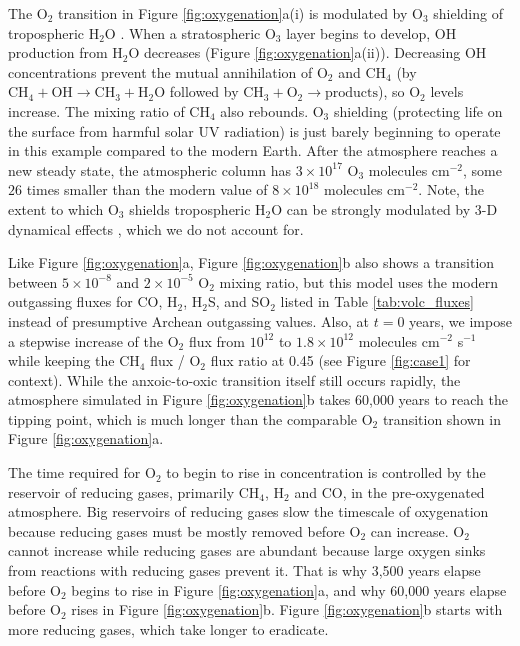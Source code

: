 The O$_2$ transition in Figure \ref{fig:oxygenation}a(i) is modulated by O$_3$ shielding of tropospheric H$_2$O \citep{Kasting_1980}. When a stratospheric O$_3$ layer begins to develop, OH production from H$_2$O decreases (Figure \ref{fig:oxygenation}a(ii)). Decreasing OH concentrations prevent the mutual annihilation of O$_2$ and CH$_4$ (by $\mathrm{CH_4} + \mathrm{OH} \rightarrow \mathrm{CH_3} + \mathrm{H_2O}$ followed by $\mathrm{CH_3} + \mathrm{O_2} \rightarrow \text{products}$), so O$_2$ levels increase. The mixing ratio of CH$_4$ also rebounds. O$_3$ shielding (protecting life on the surface from harmful solar UV radiation) is just barely beginning to operate in this example compared to the modern Earth. After the atmosphere reaches a new steady state, the atmospheric column has $3 \times 10^{17}$ O$_3$ molecules cm$^{-2}$, some $26$ times smaller than the modern value of $8 \times 10^{18}$ molecules cm$^{-2}$. Note, the extent to which O$_3$ shields tropospheric H$_2$O can be strongly modulated by 3-D dynamical effects \citep{Cooke_2022}, which we do not account for.

Like Figure \ref{fig:oxygenation}a, Figure \ref{fig:oxygenation}b also shows a transition between $5 \times 10^{-8}$ and $2 \times 10^{-5}$ O$_2$ mixing ratio, but this model uses the modern outgassing fluxes for CO, H$_2$, H$_2$S, and SO$_2$ listed in Table \ref{tab:volc_fluxes} instead of presumptive Archean outgassing values. Also, at $t = 0$ years, we impose a stepwise increase of the O$_2$ flux from $10^{12}$ to $1.8 \times 10^{12}$ molecules cm$^{-2}$ s$^{-1}$ while keeping the CH$_4$ flux / O$_2$ flux ratio at 0.45 (see Figure \ref{fig:case1} for context). While the anxoic-to-oxic transition itself still occurs rapidly, the atmosphere simulated in Figure \ref{fig:oxygenation}b takes 60,000 years to reach the tipping point, which is much longer than the comparable O$_2$ transition shown in Figure \ref{fig:oxygenation}a.

The time required for O$_2$ to begin to rise in concentration is controlled by the reservoir of reducing gases, primarily CH$_4$, H$_2$ and CO, in the pre-oxygenated atmosphere. Big reservoirs of reducing gases slow the timescale of oxygenation because reducing gases must be mostly removed before O$_2$ can increase. O$_2$ cannot increase while reducing gases are abundant because large oxygen sinks from reactions with reducing gases prevent it. That is why 3,500 years elapse before O$_2$ begins to rise in Figure \ref{fig:oxygenation}a, and why 60,000 years elapse before O$_2$ rises in Figure \ref{fig:oxygenation}b. Figure \ref{fig:oxygenation}b starts with more reducing gases, which take longer to eradicate.

